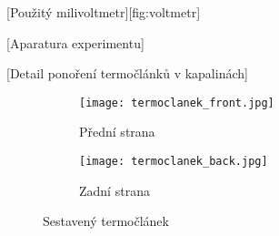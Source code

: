 [Použitý milivoltmetr][fig:voltmetr]

[Aparatura experimentu]

[Detail ponoření termočlánků v kapalinách]

\begin{figure}[htpb]
    \hfill
    \centering
    \begin{subfigure}{0.45\textwidth}
        \centering
        \texttt{[image: termoclanek\_front.jpg]}
        \caption{Přední strana}
    \end{subfigure}
    \hfill
    \begin{subfigure}{0.45\textwidth}
        \centering
        \texttt{[image: termoclanek\_back.jpg]}
        \caption{Zadní strana}
    \end{subfigure}
    \hfill
    \caption{Sestavený termočlánek}
    \label{fig:termoclanek}
\end{figure}


